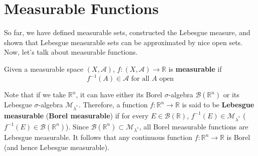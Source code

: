 \section{Measurable Functions}

  So far, we have defined measurable sets, constructed the Lebesgue measure, and shown that Lebesgue measurable sets can be approximated by nice open sets. Now, let's talk about measurable functions. 

  \begin{definition}
    Given a measurable space $(X, \mathcal{A})$, $f: (X, \mathcal{A}) \longrightarrow \mathbb{R}$ is \textbf{measurable} if 
    \begin{equation}
      f^{-1}(A) \in \mathcal{A} \text{ for all } A \text{ open}
    \end{equation}
  \end{definition}

  Note that if we take $\mathbb{R}^n$, it can have either its Borel $\sigma$-algebra $\mathcal{B}(\mathbb{R}^n)$ or its Lebesgue $\sigma$-algebra $\mathcal{M}_{\lambda^*}$. Therefore, a function $f: \mathbb{R}^n \longrightarrow \mathbb{R}$ is said to be \textbf{Lebesgue measurable} (\textbf{Borel measurable}) if for every $E \in \mathcal{B}(\mathbb{R})$, $f^{-1}(E) \in \mathcal{M}_{\lambda^*}$ ($f^{-1}(E) \in \mathcal{B}(\mathbb{R}^n)$). Since $\mathcal{B}(\mathbb{R}^n) \subset \mathcal{M}_{\lambda^*}$, all Borel measurable functions are Lebesgue measurable. It follows that any continuous function $f: \mathbb{R}^n \longrightarrow \mathbb{R}$ is Borel (and hence Lebesgue measurable). 

